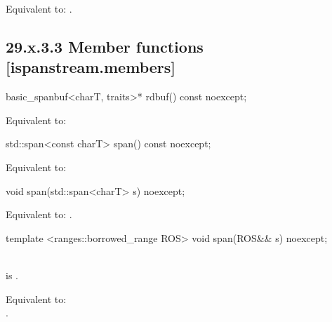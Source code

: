\documentclass[ebook,11pt,article]{memoir}
\begin{document}
\begin{itemdescr}
\pnum
\effects Equivalent to: 
.
\end{itemdescr}

\subsection{29.x.3.3 Member functions [ispanstream.members]}
\label{ispanstream.members}

\begin{itemdecl}
basic_spanbuf<charT, traits>* rdbuf() const noexcept;
\end{itemdecl}

\begin{itemdescr}
\pnum
\effects Equivalent to:\\
\end{itemdescr}

\begin{itemdecl}
std::span<const charT> span() const noexcept;
\end{itemdecl}

\begin{itemdescr}
\pnum
\effects Equivalent to:\\
\end{itemdescr}

\begin{itemdecl}
void span(std::span<charT> s) noexcept;
\end{itemdecl}

\begin{itemdescr}
\pnum
\effects
Equivalent to:
.
\end{itemdescr}




\begin{itemdecl}
template <ranges::borrowed_range ROS>
void span(ROS&& s) noexcept;
\end{itemdecl}

\begin{itemdescr}
\pnum
\constraints
{}\\  is .
 
\pnum
\effects
Equivalent to: \\
.
\end{itemdescr}
\end{document}
